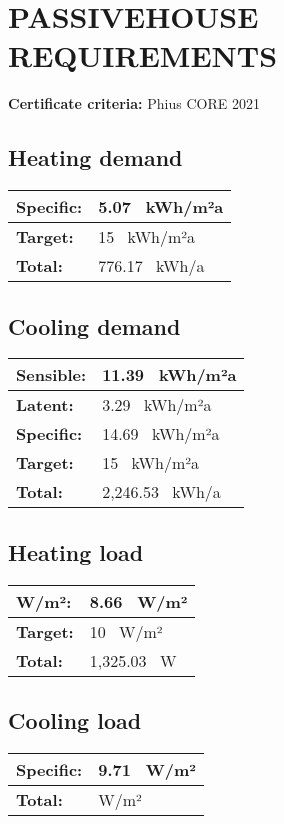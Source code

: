 \documentclass{article}
\begin{document}
\section*{PASSIVEHOUSE REQUIREMENTS}
\textbf{Certificate criteria:} Phius CORE 2021

\subsection*{Heating demand}
\begin{longtable}{| l | l |}
\hline
\textbf{Specific:} & 5.07 \, kWh/m²a \\
\hline
\textbf{Target:} & 15 \, kWh/m²a \\
\hline
\textbf{Total:} & 776.17 \, kWh/a \\
\hline
\end{longtable}

\subsection*{Cooling demand}
\begin{longtable}{| l | l |}
\hline
\textbf{Sensible:} & 11.39 \, kWh/m²a \\
\hline
\textbf{Latent:} & 3.29 \, kWh/m²a \\
\hline
\textbf{Specific:} & 14.69 \, kWh/m²a \\
\hline
\textbf{Target:} & 15 \, kWh/m²a \\
\hline
\textbf{Total:} & 2,246.53 \, kWh/a \\
\hline
\end{longtable}

\subsection*{Heating load}
\begin{longtable}{| l | l |}
\hline
\textbf{W/m²:} & 8.66 \, W/m² \\
\hline
\textbf{Target:} & 10 \, W/m² \\
\hline
\textbf{Total:} & 1,325.03 \, W \\
\hline
\end{longtable}

\subsection*{Cooling load}
\begin{longtable}{| l | l |}
\hline
\textbf{Specific:} & 9.71 \, W/m² \\
\hline
\textbf{Total:} & W/m² \\
\hline
\end{longtable}
\end{document}
